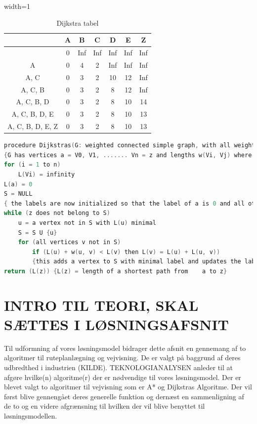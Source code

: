 \begin{table}[ht!]
\centering
\begin{adjustbox}{width=1\textwidth}
\Large
\begin{tabular}{| c | c | c | c | c | c | c |}
	\hline
	 & A & B & C & D & E & Z \\
	\hline
	 & 0 & Inf & Inf & Inf & Inf & Inf \\
	\hline
	{A} & 0 & 4 & 2 & Inf & Inf & Inf \\
	\hline
	{A, C} & 0 & 3 & 2 & 10 & 12 & Inf \\
	\hline
	{A, C, B} & 0 & 3 & 2 & 8 & 12 & Inf \\
	\hline
	{A, C, B, D} & 0 & 3 & 2 & 8 & 10 & 14 \\
	\hline
	{A, C, B, D, E} & 0 & 3 & 2 & 8 & 10 & 13 \\
	\hline
	{A, C, B, D, E, Z} & 0 & 3 & 2 & 8 & 10 & 13 \\
	\hline
\end{tabular}
\end{adjustbox}
\caption{Dijkstra tabel}\label{fig:dijkstratabel}
\end{table}

\begin{lstlisting}[language=C,caption={Dijkstras angivet som eksempel i pseudo-kode},label={lst:DijsktrasPseudo1}]
	procedure Dijkstras(G: weighted connected simple graph, with all weights positive)
{G has vertices a = V0, V1, ....... Vn = z and lengths w(Vi, Vj) where w(Vi,Vj) = infinity if{Vi, Vj} is not an edge in G}
for (i = 1 to n)
	L(Vi) = infinity
L(a) = 0
S = NULL
{ the labels are now initialized so that the label of a is 0 and all other labels are infinity, and S is the empty set }
while (z does not belong to S)
	u = a vertex not in S with L(u) minimal
	S = S U {u}
	for (all vertices v not in S)
		if (L(u) + w(u, v) < L(v) then L(v) = L(u) + L(u, v))
		{this adds a vertex to S with minimal label and updates the labels of vertices not in S}
return (L(z)) {L(z) = length of a shortest path from 	a to z}
\end{lstlisting}

\vspace{5mm}

\section{INTRO TIL TEORI, SKAL SÆTTES I LØSNINGSAFSNIT}
Til udformning af vores løsningsmodel bidrager dette afsnit en gennemang af to algoritmer til ruteplanlægning og vejvisning. De er valgt på baggrund af deres udbredthed i industrien (KILDE). TEKNOLOGIANALYSEN anleder til at afgøre hvilke(n) algoritme(r) der er nødvendige til vores løsningsmodel. Der er blevet valgt to algoritmer til vejvisning som er A* og Dijkstras Algoritme.
Der vil først blive gennengået deres generelle funktion og dernæst en sammenligning af de to og en videre afgrænsning til hvilken der vil blive benyttet til løsningsmodellen.

